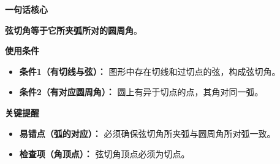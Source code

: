 \begin{summarybox}
	\textbf{\textcolor{CSummary}{一句话核心}}

	\textbf{弦切角等于它所夹弧所对的圆周角}。

	\medskip
	\textbf{\textcolor{CSummary}{使用条件}}
	\begin{itemize}[leftmargin=*, itemsep=0.5em, topsep=0.4em]
		\item \textbf{条件1（有切线与弦）：} 图形中存在切线和过切点的弦，构成弦切角。
		\item \textbf{条件2（有对应圆周角）：} 圆上有异于切点的点，其角对同一弧。
	\end{itemize}

	\medskip
	\textbf{\textcolor{CSummary}{关键提醒}}
	\begin{itemize}[leftmargin=*, itemsep=0.5em, topsep=0.4em]
		\item \textbf{易错点（弧的对应）：} 必须确保弦切角所夹弧与圆周角所对弧一致。
		\item \textbf{检查项（角顶点）：} 弦切角顶点必须为切点。
	\end{itemize}
\end{summarybox}
